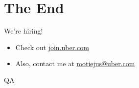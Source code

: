 \documentclass[14pt]{beamer}
\begin{document}
\section{The End}
\begin{frame}{We're hiring!}
    \begin{itemize}
        \item Check out \href{http://join.uber.com}{join.uber.com}
        \item Also, contact me at \href{mailto:motiejus@uber.com}{motiejus@uber.com}
    \end{itemize}
\end{frame}

\begin{frame}{QA}
\end{frame}
\end{document}
